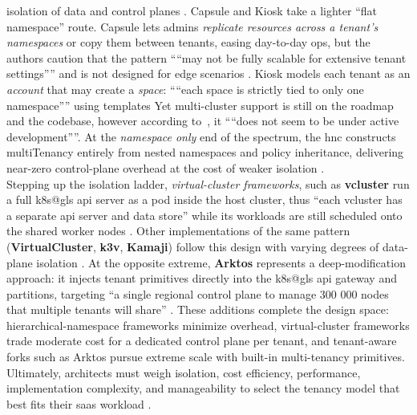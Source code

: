 \documentclass[11pt, a4paper, oneside, listof=totoc]{scrartcl}
\begin{document}
            isolation of data and control planes \parencite[p.~651]{nguyen2022}.
            Capsule and Kiosk take a lighter “flat namespace” route.  
            Capsule lets admins \textit{replicate resources across a tenant's namespaces} or copy
            them between tenants, easing day-to-day ops, but the authors caution that the pattern
            \enquote{“may not be fully scalable for extensive tenant settings”} and is not designed
            for edge scenarios \parencite[p.~144581]{senel2023}.
            Kiosk models each tenant as an \textit{account} that may create a \textit{space}:
            \enquote{“each space is strictly tied to only one namespace”} using templates
            \parencite[p.~144581]{senel2023}
            Yet multi-cluster support is still on the roadmap and the codebase, however according
            to~\cite{senel2023}, it \enquote{“does not seem to be under active development”}.
            At the \textit{namespace only} end of the spectrum, the \gls{hnc} constructs
            \gls{multiTenancy} entirely from nested namespaces and policy inheritance, delivering
            near-zero control-plane overhead at the cost of weaker isolation
            \parencite[p.~144581]{senel2023}.
            \\
            Stepping up the isolation ladder, \textit{virtual-cluster frameworks}, such as
            \textbf{vcluster} run a full \gls{k8s@gls} \gls{api} server as a pod inside the host
            cluster, thus \enquote{each vcluster has a separate \gls{api} server and data store}
            while its workloads are still scheduled onto the shared worker nodes
            \parencite[pp.~144580--144581]{senel2023}.
            Other implementations of the same pattern (\textbf{VirtualCluster}, \textbf{k3v},
            \textbf{Kamaji}) follow this design with varying degrees of data-plane isolation
            \parencite[pp.~144580--144581]{senel2023}.
            At the opposite extreme, \textbf{Arktos} represents a deep-modification approach: it
            injects tenant primitives directly into the \gls{k8s@gls} \gls{api} gateway and
            partitions, targeting \enquote{a single regional control plane to manage 300 000 nodes
            that multiple tenants will share} \parencite[p.~144582]{senel2023}.
            These additions complete the design space: hierarchical-namespace frameworks minimize
            overhead, virtual-cluster frameworks trade moderate cost for a dedicated control plane
            per tenant, and tenant-aware forks such as Arktos pursue extreme scale with built-in
            multi-tenancy primitives.
            \\
            Ultimately, architects must weigh isolation, cost efficiency, performance,
            implementation complexity, and manageability to select the tenancy model that best fits
            their \gls{saas} workload \parencite[p.~137]{azureWhitepaper}.
\end{document}
